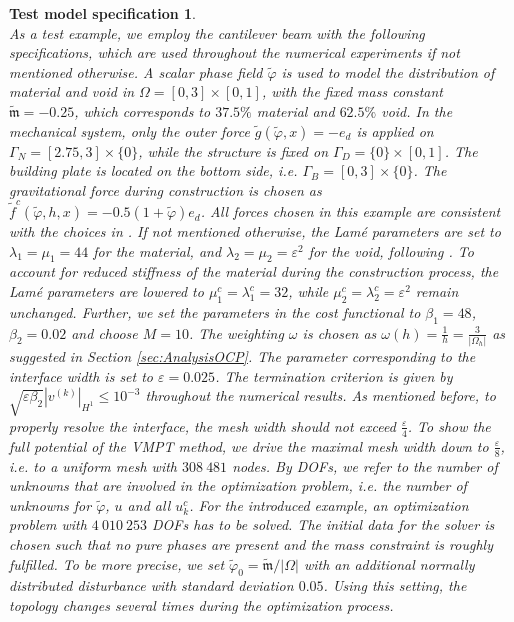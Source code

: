 \documentclass[a4paper,11pt]{article}
\newtheorem{testexample}{Test model specification}
\theoremstyle{remark}
\begin{document}
\begin{testexample} \label{testEx} 
\hfill   \\
{\rm
  As a test example, we employ the cantilever beam with the following specifications, which are used throughout the numerical experiments if not mentioned otherwise.
A scalar phase field $\tilde{\varphi}$ is used to model the distribution of material and void in $\Omega= [0,3] \times [0,1]$, with the fixed mass constant $\tilde{\mathfrak{m}}=-0.25$, which corresponds to $37.5\%$ material and $62.5\%$ void. 
In the mechanical system, only the outer force $\tilde g(\tilde{\varphi},x) = -e_d$ is applied on $\Gamma_N = [2.75,3] \times \{0\}$, while the structure is fixed on $\Gamma_D=\{0\} \times [0,1]$. 
The building plate is located on the bottom side, i.e. $\Gamma_B = [0,3]\times\{0\}$. The gravitational force during construction is chosen as $\tilde{ f}^c(\tilde{\varphi},h,x)= -0.5(1+\tilde{\varphi})e_d$. 
All forces chosen in this example are consistent with the choices in  \cite{AllaireBogoselSupports1,AllaireOverview2}. 
If not mentioned otherwise, the Lamé parameters are set to $\lambda_1=\mu_1=44$ for the material, and $\lambda_2=\mu_2=\varepsilon^2$ for the void, following \cite{AllaireBogoselSupports1,AllaireOverview2,VMPT}.
To account for reduced stiffness of the material during the construction process, the Lamé parameters are lowered to $\mu_1^c=\lambda_1^c = 32$, while $\mu_2^c=\lambda_2^c = \varepsilon^2$ remain unchanged.
Further, we set the parameters in the cost functional to $\beta_1 = 48$, $\beta_2 = 0.02$ and choose $M=10$. The weighting $\omega$ is chosen as $\omega(h) = \frac{1}{h}= \frac{3}{|\Omega_h|}$ as suggested in Section \ref{sec:AnalysisOCP}. 
The parameter corresponding to the interface width is set to $\varepsilon= 0.025$. 
The termination criterion is given by $\sqrt{\varepsilon\beta_2}|v^{(k)}|_{H^1}\leq 10^{-3}$ throughout the numerical results. 
As mentioned before, to properly resolve the interface, the mesh width should not exceed $\frac{\varepsilon}{4}$. 
To show the full potential of the VMPT method, we drive the maximal mesh width down to $\frac{\varepsilon}{8}$, i.e. to a uniform mesh with $308~481$ nodes.
By DOFs, we refer to the number of unknowns that are involved in the optimization problem, i.e. the number of unknowns for $\tilde{\varphi}$, $u$ and all $u^c_k$. For the introduced example, an optimization problem with $4~010~253$ DOFs has to be solved. 
The initial data for the solver
is chosen such that no pure phases are present and the mass constraint is roughly fulfilled. To be more precise, we set
$\tilde{\varphi}_0=\tilde{\mathfrak{m}} /|\Omega |$
with an additional normally distributed disturbance with standard deviation $0.05$.
Using this setting, the topology changes several times during the optimization process.
}
\end{testexample}
\end{document}
